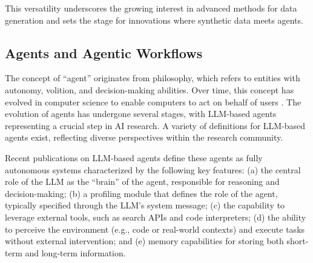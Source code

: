 \documentclass[12pt,a4paper]{article}
\newcommand{\qq}[1]{``#1''}  %
\begin{document}

This versatility underscores the growing interest in advanced methods for data generation and sets the stage for innovations where synthetic data meets agents.

\subsection{Agents and Agentic Workflows}
The concept of \qq{agent} originates from philosophy, which refers to entities with autonomy, volition, and decision-making abilities. Over time, this concept has evolved in computer science to enable computers to act on behalf of users \cite{agents-r6}. The evolution of agents has undergone several stages, with LLM-based agents representing a crucial step in AI research\cite{agents-r2,agents-r6}. A variety of definitions for LLM-based agents exist, reflecting diverse perspectives within the research community.

Recent publications on LLM-based agents \cite{agents-r1,agents-r2,agents-r6,agents-r10} define these agents as fully autonomous systems characterized by the following key features: (a) the central role of the LLM as the \qq{brain} of the agent, responsible for reasoning and decision-making; (b) a profiling module that defines the role of the agent, typically specified through the LLM's system message; (c) the capability to leverage external tools, such as search APIs and code interpreters; (d) the ability to perceive the environment (e.g., code or real-world contexts) and execute tasks without external intervention; and (e) memory capabilities for storing both short-term and long-term information.
\end{document}
